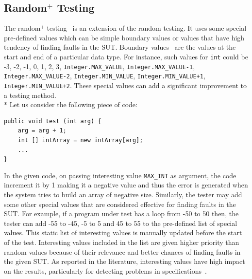 \subsection{Random$^+$ Testing} \label{subsec:randomPlusTesting}
The random$^+$ testing~\cite{leitner2007reconciling} is an extension of the random testing. It uses some special pre-defined values which can be simple boundary values or values that have high tendency of finding faults in the SUT. Boundary values~\cite{beizer2003software} are the values at the start and end of a particular data type. For instance, such values for \verb+int+ could be -3, -2, -1, 0, 1, 2, 3, \verb+Integer.MAX_VALUE+, \verb+Integer.MAX_VALUE-1+, \verb+Integer.MAX_VALUE-2+, \verb+Integer.MIN_VALUE+, \verb-Integer.MIN_VALUE+1-, \verb-Integer.MIN_VALUE+2-. These special values can add a significant improvement to a testing method. \\*
Let us consider the following piece of code:
\bigskip
\bigskip
\begin{lstlisting}
public void test (int arg) {
	arg = arg + 1;
	int [] intArray = new intArray[arg];
	...
}
\end{lstlisting}
\bigskip

In the given code, on passing interesting value \verb+MAX_INT+ as argument, the code increment it by 1 making it a negative value and thus the error is generated when the system tries to build an array of negative size. Similarly, the tester may add some other special values that are considered effective for finding faults in the SUT. For example, if a program under test has a loop from -50 to 50 then, the tester can add -55 to -45, -5 to 5 and 45 to 55 to the pre-defined list of special values. This static list of interesting values is manually updated before the start of the test. Interesting values included in the list are given higher priority than random values because of their relevance and better chances of finding faults in the given SUT. As reported in the literature, interesting values have high impact on the results, particularly for detecting problems in specifications~\cite{ciupa2008finding}.


